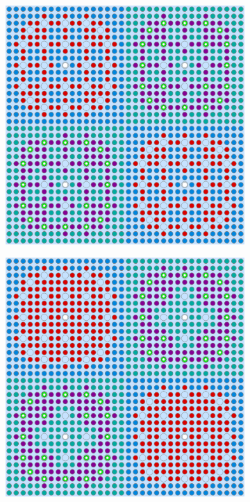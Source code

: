 \begin{figure}[h!]
\centering
\begin{subfigure}{0.48\textwidth}
  \centering
  \includegraphics[width=0.9\linewidth]{figures/unsupervised/geometries/with-features/2-clusters/pinch/2x2}
  \caption{}
  \label{fig:chap10-2x2-pinch-2}
\end{subfigure}%
\begin{subfigure}{0.48\textwidth}
  \centering
  \includegraphics[width=0.9\linewidth]{figures/unsupervised/geometries/with-features/2-clusters/combined/2x2}

\end{subfigure}
\end{figure}

